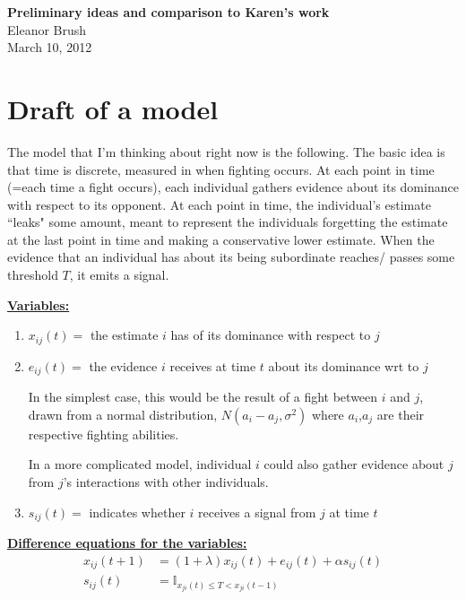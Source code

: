 \documentclass{article}
\begin{document}
\begin{center}
\Large

\end{center}


\vspace{0pt}

\begin{center}
{\bf Preliminary ideas and comparison to Karen's work}
\\ Eleanor Brush
\\ March 10, 2012
\end{center}

\vspace{0pt}
\normalsize
\section{Draft of a model}

The model that I'm thinking about right now is the following.  The basic idea is that time is discrete, measured in when fighting occurs.  At each point in time (=each time a fight occurs), each individual gathers evidence about its dominance with respect to its opponent.  At each point in time, the individual's estimate ``leaks" some amount, meant to represent the individuals forgetting the estimate at the last point in time and making a conservative lower estimate.  When the evidence that an individual has about its being subordinate reaches/ passes some threshold $T$, it emits a signal.


\underline{\bf Variables:}
\begin{enumerate}
\item{$x_{ij}(t)=$ the estimate $i$ has of its dominance with respect to $j$}
\item{$e_{ij}(t)=$ the evidence $i$ receives at time $t$ about its dominance wrt to $j$

In the simplest case, this would be the result of a fight between $i$ and $j$, drawn from a normal distribution, $N(a_i-a_j,\sigma^2)$ where $a_i$,$a_j$ are their respective fighting abilities.  

In a more complicated model, individual $i$ could also gather evidence about $j$ from $j$'s interactions with other individuals.}
\item{$s_{ij}(t)=$ indicates whether $i$ receives a signal from $j$ at time $t$}
\end{enumerate}


\underline{\bf Difference equations for the variables:}
\begin{align*}
x_{ij}(t+1)&=(1+\lambda)x_{ij}(t)+e_{ij}(t)+\alpha s_{ij}(t)
\\ s_{ij}(t)&=\mathbb{I}_{x_{ji}(t)\leq T< x_{ji}(t-1)}
\end{align*}
\end{document}
